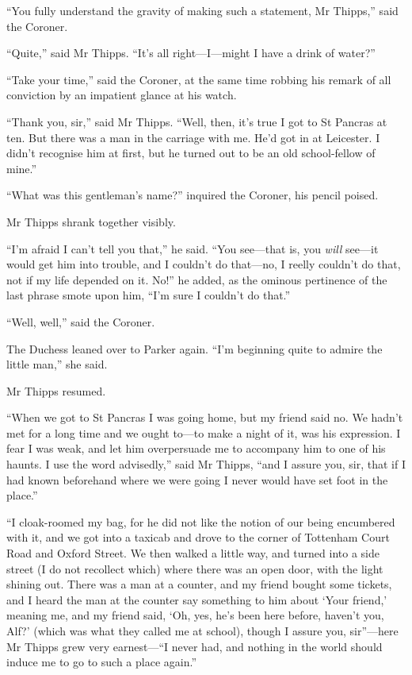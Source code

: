\enquote{You fully understand the gravity of making such a statement, Mr Thipps,} said the Coroner.

\enquote{Quite,} said Mr Thipps. \enquote{It’s all right\allowbreak---\allowbreak I---might I have a drink of water?}

\enquote{Take your time,} said the Coroner, at the same time robbing his remark of all conviction by an impatient glance at his watch.

\enquote{Thank you, sir,} said Mr Thipps. \enquote{Well, then, it’s true I got to St Pancras at ten. But there was a man in the carriage with me. He’d got in at Leicester. I didn’t recognise him at first, but he turned out to be an old school-fellow of mine.}

\enquote{What was this gentleman’s name?} inquired the Coroner, his pencil poised.

Mr Thipps shrank together visibly.

\enquote{I’m afraid I can’t tell you that,} he said. \enquote{You see\allowbreak---\allowbreak that is, you \textit{will} see\allowbreak---\allowbreak it would get him into trouble, and I couldn’t do that\allowbreak---\allowbreak no, I reelly couldn’t do that, not if my life depended on it. No!} he added, as the ominous pertinence of the last phrase smote upon him, \enquote{I’m sure I couldn’t do that.}

\enquote{Well, well,} said the Coroner.

The Duchess leaned over to Parker again. \enquote{I’m beginning quite to admire the little man,} she said.

Mr Thipps resumed.

\enquote{When we got to St Pancras I was going home, but my friend said no. We hadn’t met for a long time and we ought to\allowbreak---\allowbreak to make a night of it, was his expression. I fear I was weak, and let him overpersuade me to accompany him to one of his haunts. I use the word advisedly,} said Mr Thipps, \enquote{and I assure you, sir, that if I had known beforehand where we were going I never would have set foot in the place.}

\enquote{I cloak-roomed my bag, for he did not like the notion of our being encumbered with it, and we got into a taxicab and drove to the corner of Tottenham Court Road and Oxford Street. We then walked a little way, and turned into a side street (I do not recollect which) where there was an open door, with the light shining out. There was a man at a counter, and my friend bought some tickets, and I heard the man at the counter say something to him about \enquote{Your friend,} meaning me, and my friend said, \enquote{Oh, yes, he’s been here before, haven’t you, Alf?} (which was what they called me at school), though I assure you, sir}---here Mr Thipps grew very earnest---\enquote{I never had, and nothing in the world should induce me to go to such a place again.}

